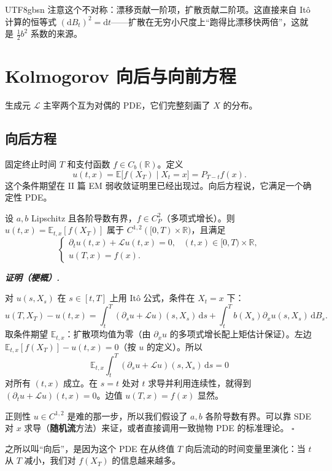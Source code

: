 \documentclass{article}
\newenvironment{proof}[1][证明]{%
  \par\smallskip\noindent\textit{\textbf{#1.}}\quad\ignorespaces
}{%
  \hfill$\square$\par\smallskip
}
\theoremstyle{plain}
\theoremstyle{definition}
\begin{document}
\begin{CJK*}{UTF8}{gbsn}
注意这个不对称：漂移贡献一阶项，扩散贡献二阶项。这直接来自 It\^o 计算的恒等式 $(\mathrm{d}B_t)^2=\mathrm{d}t$——扩散在无穷小尺度上“跑得比漂移快两倍”，这就是 $\tfrac{1}{2}b^2$ 系数的来源。

\section{Kolmogorov 向后与向前方程}

生成元 $\mathcal{L}$ 主宰两个互为对偶的 PDE，它们完整刻画了 $X$ 的分布。

\subsection{向后方程}

固定终止时间 $T$ 和支付函数 $f\in C_b(\mathbb{R})$。定义
\[
  u(t,x)=\mathbb{E}\bigl[f(X_T)\mid X_t=x\bigr]=P_{T-t}f(x).
\]
这个条件期望在 II 篇 EM 弱收敛证明里已经出现过。向后方程说，它满足一个确定性 PDE。

\begin{theorem}\label{thm:backward}
设 $a,b$ Lipschitz 且各阶导数有界，$f\in C^2_P$（多项式增长）。则 $u(t,x)=\mathbb{E}_{t,x}[f(X_T)]$ 属于 $C^{1,2}([0,T)\times\mathbb{R})$，且满足
\[
  \begin{cases}
    \partial_t u(t,x)+\mathcal{L}u(t,x)=0,& (t,x)\in[0,T)\times\mathbb{R},\\
    u(T,x)=f(x).
  \end{cases}
\]
\end{theorem}

\begin{proof}[证明（梗概）]
对 $u(s,X_s)$ 在 $s\in[t,T]$ 上用 It\^o 公式，条件在 $X_t=x$ 下：
\[
  u(T,X_T)-u(t,x)=\int_t^T(\partial_s u+\mathcal{L}u)(s,X_s)\,\mathrm{d}s+\int_t^T b(X_s)\partial_x u(s,X_s)\,\mathrm{d}B_s.
\]
取条件期望 $\mathbb{E}_{t,x}$：扩散项均值为零（由 $\partial_x u$ 的多项式增长配上矩估计保证）。左边 $\mathbb{E}_{t,x}[f(X_T)]-u(t,x)=0$（按 $u$ 的定义）。所以
\[
  \mathbb{E}_{t,x}\!\int_t^T(\partial_s u+\mathcal{L}u)(s,X_s)\,\mathrm{d}s=0
\]
对所有 $(t,x)$ 成立。在 $s=t$ 处对 $t$ 求导并利用连续性，就得到 $(\partial_t u+\mathcal{L}u)(t,x)=0$。边值 $u(T,x)=f(x)$ 显然。

正则性 $u\in C^{1,2}$ 是难的那一步，所以我们假设了 $a,b$ 各阶导数有界。可以靠 SDE 对 $x$ 求导（\textbf{随机流}方法）来证，或者直接调用一致抛物 PDE 的标准理论。
\end{proof}

之所以叫“向后”，是因为这个 PDE 在从终值 $T$ 向后流动的时间变量里演化：当 $t$ 从 $T$ 减小，我们对 $f(X_T)$ 的信息越来越多。


\end{CJK*}
\end{document}
